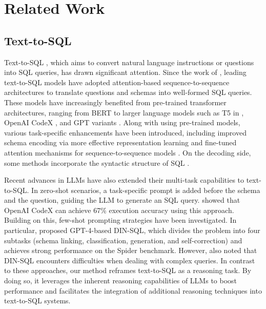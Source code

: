 \section{Related Work}
\subsection{Text-to-SQL}
Text-to-SQL \citep{cai2017encoder, zelle1996learning, xu2017sqlnet, yu2018typesql, yaghmazadeh2017sqlizer}, which aims to convert natural language instructions or questions into SQL queries, has drawn significant attention. Since the work of \citet{dong2016language}, leading text-to-SQL models have adopted attention-based sequence-to-sequence architectures to translate questions and schemas into well-formed SQL queries. These models have increasingly benefited from pre-trained transformer architectures, ranging from BERT \citep{hwang2019comprehensive, lin2020bridging} to larger language models such as T5 \citep{raffel2020exploring} in \citet{scholak2021picard}, OpenAI CodeX \citep{chen2021evaluating}, and GPT variants \citep{rajkumar2022evaluating, liu2023divide, pourreza2024din}. Along with using pre-trained models, various task-specific enhancements have been introduced, including improved schema encoding via more effective representation learning \citep{bogin2019representing} and fine-tuned attention mechanisms for sequence-to-sequence models \citep{wang2019rat}. On the decoding side, some methods incorporate the syntactic structure of SQL \citep{hwang2019comprehensive, xu2017sqlnet, hui2021improving}.

Recent advances in LLMs have also extended their multi-task capabilities to text-to-SQL. In zero-shot scenarios, a task-specific prompt is added before the schema and the question, guiding the LLM to generate an SQL query. \citet{rajkumar2022evaluating, liu2023comprehensive} showed that OpenAI CodeX can achieve 67\% execution accuracy using this approach. Building on this, few-shot prompting strategies have been investigated. In particular, \citet{pourreza2024din, liu2023divide} proposed GPT-4-based DIN-SQL, which divides the problem into four subtasks (schema linking, classification, generation, and self-correction) and achieves strong performance on the Spider benchmark. However, \citet{pourreza2024din} also noted that DIN-SQL encounters difficulties when dealing with complex queries. In contrast to these approaches, our method reframes text-to-SQL as a reasoning task. By doing so, it leverages the inherent reasoning capabilities of LLMs to boost performance and facilitates the integration of additional reasoning techniques into text-to-SQL systems.

